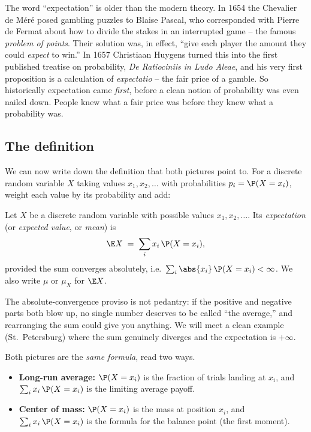 \begin{historybox}
The word ``expectation'' is older than the modern theory. In 1654 the Chevalier
de M\'er\'e posed gambling puzzles to Blaise Pascal, who corresponded with Pierre
de Fermat about how to divide the stakes in an interrupted game -- the famous
\emph{problem of points}. Their solution was, in effect, ``give each player the
amount they could \emph{expect} to win.'' In 1657 Christiaan Huygens turned this
into the first published treatise on probability, \emph{De Ratiociniis in Ludo
Aleae}, and his very first proposition is a calculation of \emph{expectatio} --
the fair price of a gamble. So historically expectation came \emph{first}, before
a clean notion of probability was even nailed down. People knew what a fair price
was before they knew what a probability was.
\end{historybox}

\subsection{The definition}

We can now write down the definition that both pictures point to. For a discrete
random variable $X$ taking values $x_1, x_2, \dots$ with probabilities
$p_i = \P(X = x_i)$, weight each value by its probability and add:

\begin{definition}
\label{ch08:def-expectation}
Let $X$ be a discrete random variable with possible values $x_1,x_2,\dots$. Its
\emph{expectation} (or \emph{expected value}, or \emph{mean}) is
\[
  \E X \;=\; \sum_i x_i\,\P(X = x_i),
\]
provided the sum converges absolutely, i.e.\ $\sum_i \abs{x_i}\,\P(X=x_i) < \infty$.
We also write $\mu$ or $\mu_X$ for $\E X$.
\end{definition}

The absolute-convergence proviso is not pedantry: if the positive and negative
parts both blow up, no single number deserves to be called ``the average,'' and
rearranging the sum could give you anything. We will meet a clean example (St.\
Petersburg) where the sum genuinely diverges and the expectation is $+\infty$.

\begin{focusbox}
Both pictures are the \emph{same formula}, read two ways.
\begin{itemize}
  \item \textbf{Long-run average:} $\P(X=x_i)$ is the fraction of trials landing
  at $x_i$, and $\sum_i x_i\,\P(X=x_i)$ is the limiting average payoff.
  \item \textbf{Center of mass:} $\P(X=x_i)$ is the mass at position $x_i$, and
  $\sum_i x_i\,\P(X=x_i)$ is the formula for the balance point (the first moment).
\end{itemize}
\end{focusbox}

